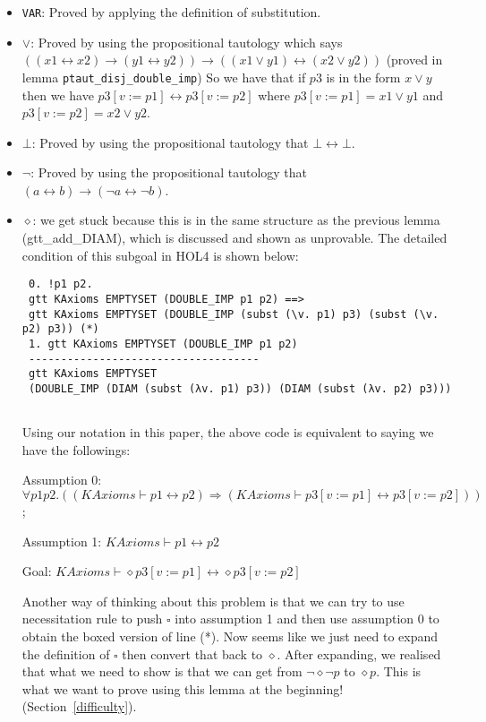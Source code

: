 \documentclass[submission,copyright,creativecommons]{eptcs}
\begin{document}
\begin{itemize}
 \item \texttt{VAR}: Proved by applying the definition of substitution.
 \item $\vee$: Proved by using the propositional tautology which says 
 $((x1 \leftrightarrow x2) \rightarrow (y1 \leftrightarrow y2)) \rightarrow ((x1 \vee y1)\leftrightarrow(x2 \vee y2)) $ (proved in lemma \texttt{ptaut\_disj\_double\_imp})
 So we have that if $p3$ is in the form $x \vee y$ then we have 
 $p3[v:=p1] \leftrightarrow p3[v:=p2]$ where $p3[v:=p1] = x1 \vee y1$ and $p3[v:=p2] = x2 \vee y2$.
 \item $\bot$: Proved by using the propositional tautology that $\bot \leftrightarrow \bot$.
 \item $\neg$: Proved by using the propositional tautology that $(a \leftrightarrow b)
 \rightarrow (\neg a \leftrightarrow \neg b)$.
 \item $\diamond$: we get stuck because this is in the same structure as the previous lemma
 (gtt\_add\_DIAM), which is discussed and shown as unprovable. The detailed condition of this 
 subgoal in HOL4 is shown below:
 \begin{verbatim}
 0. !p1 p2.
 gtt KAxioms EMPTYSET (DOUBLE_IMP p1 p2) ==>
 gtt KAxioms EMPTYSET (DOUBLE_IMP (subst (\v. p1) p3) (subst (\v. p2) p3)) (*)
 1. gtt KAxioms EMPTYSET (DOUBLE_IMP p1 p2)
 ------------------------------------
 gtt KAxioms EMPTYSET
 (DOUBLE_IMP (DIAM (subst (λv. p1) p3)) (DIAM (subst (λv. p2) p3)))
 
 \end{verbatim}

 Using our notation in this paper, the above code is equivalent to saying we have the followings:

 Assumption 0: $\forall p1 p2. 
 ((KAxioms \vdash p1 \leftrightarrow p2) \Rightarrow (KAxioms \vdash p3[v:=p1]\leftrightarrow p3[v:=p2]))$;

 Assumption 1: $KAxioms \vdash p1 \leftrightarrow p2$

 Goal: $KAxioms \vdash \diamond p3[v:=p1] \leftrightarrow \diamond p3[v:=p2]$


 Another way of thinking 
 about this problem is that we can try to use necessitation rule to push $\square$
 into assumption 1 and then use assumption 0 to obtain the boxed version of 
 line (*). Now seems like we just need to expand the definition of $\square$ then convert that 
 back to $\diamond$. After expanding, we realised that what we need to show is that 
 we can get from $\neg \diamond \neg p$ to $\diamond p$. This is what we want to prove 
 using this lemma at the beginning!(Section~\ref{difficulty}).
\end{itemize}
\end{document}
